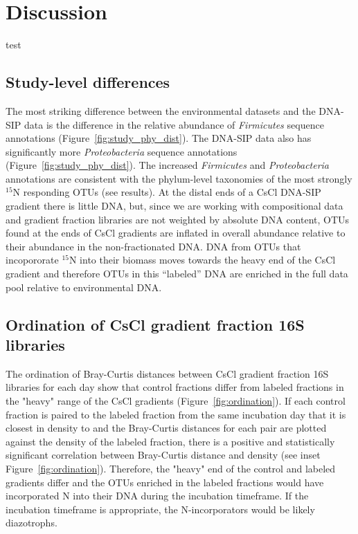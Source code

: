 \section{Discussion}

test

\subsection{Study-level differences}
The most striking difference between the environmental datasets
\citep{Garcia_Pichel_2013, Steven_2013} and the DNA-SIP data is the difference
in the relative abundance of \textit{Firmicutes} sequence annotations
(Figure~\ref{fig:study_phy_dist}). The DNA-SIP data also has significantly more
\textit{Proteobacteria} sequence annotations (Figure~\ref{fig:study_phy_dist}).
The increased \textit{Firmicutes} and \textit{Proteobacteria} annotations are
consistent with the phylum-level taxonomies of the most strongly $^{15}$N
responding OTUs (see results). At the distal ends of a CsCl DNA-SIP gradient
there is little DNA, but, since we are working with compositional data and
gradient fraction libraries are not weighted by absolute DNA content, OTUs
found at the ends of CsCl gradients are inflated in overall abundance relative
to their abundance in the non-fractionated DNA. DNA from OTUs that incopororate
$^{15}$N into their biomass moves towards the heavy end of the CsCl gradient
and therefore OTUs in this ``labeled'' DNA are enriched in the full data pool
relative to environmental DNA. 

\subsection{Ordination of CsCl gradient fraction 16S libraries}
The ordination of Bray-Curtis distances between CsCl gradient fraction 16S
libraries for each day show that control fractions differ from labeled
fractions in the "heavy" range of the CsCl gradients
(Figure~\ref{fig:ordination}). If each control fraction is paired to the
labeled fraction from the same incubation day that it is closest in density to
and the Bray-Curtis distances for each pair are plotted against the density of
the labeled fraction, there is a positive and statistically significant
correlation between Bray-Curtis distance and density (see inset
Figure~\ref{fig:ordination}).  Therefore, the "heavy" end of the control and
labeled gradients differ and the
OTUs enriched in the labeled fractions would have incorporated N into their DNA
during the incubation timeframe. If the incubation timeframe is appropriate,
the N-incorporators would be likely diazotrophs.     

